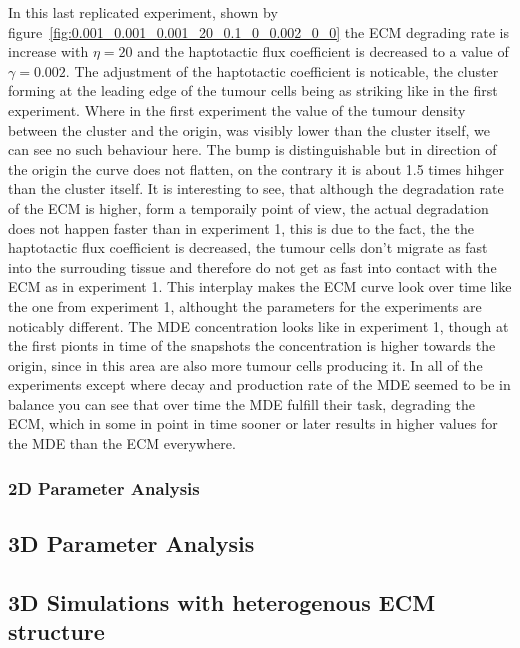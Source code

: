 In this last replicated experiment, shown by figure~\ref{fig:0.001_0.001_0.001_20_0.1_0_0.002_0_0} the ECM degrading rate is increase with $\eta = 20$ and the haptotactic flux coefficient is decreased to a value of $\gamma = 0.002$. The adjustment of the haptotactic coefficient is noticable, the cluster forming at the leading edge of the tumour cells being as striking like in the first experiment. Where in the first experiment the value of the tumour density between the cluster and the origin, was visibly lower than the cluster itself, we can see no such behaviour here. The bump is distinguishable but in direction of the origin the curve does not flatten, on the contrary it is about 1.5 times hihger than the cluster itself. It is interesting to see, that although the degradation rate of the ECM is higher, form a temporaily point of view, the actual degradation does not happen faster than in experiment 1, this is due to the fact, the the haptotactic flux coefficient is decreased, the tumour cells don't migrate as fast into the surrouding tissue and therefore do not get as fast into contact with the ECM as in experiment 1. This interplay makes the ECM curve look over time like the one from experiment 1, althought the parameters for the experiments are noticably different. The MDE concentration looks like in experiment 1, though at the first pionts in time of the snapshots the concentration is higher towards the origin, since in this area are also more tumour cells producing it. \newline 
In all of the experiments except where decay and production rate of the MDE seemed to be in balance you can see that over time the MDE fulfill their task, degrading the ECM, which in some in point in time sooner or later results in higher values for the MDE than the ECM everywhere. 
\subsubsection{2D Parameter Analysis}
\subsection{3D Parameter Analysis}
\subsection{3D Simulations with heterogenous ECM structure}